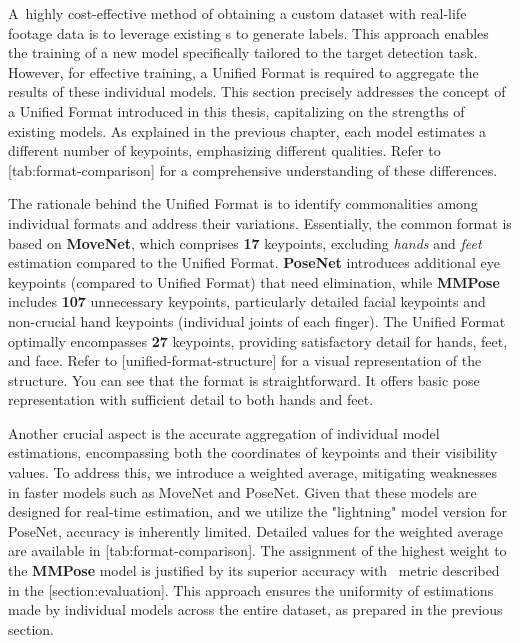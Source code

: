 A~highly cost-effective method of obtaining a custom dataset with real-life footage data is to leverage existing \NN\-s to generate labels. This approach enables the training of a new model specifically tailored to the target detection task. However, for effective training, a Unified Format is required to aggregate the results of these individual models. This section precisely addresses the concept of a Unified Format introduced in this thesis, capitalizing on the strengths of existing models. As explained in the previous chapter, each model estimates a different number of keypoints, emphasizing different qualities. Refer to [tab:format-comparison] for a comprehensive understanding of these differences.

The rationale behind the Unified Format is to identify commonalities among individual formats and address their variations. Essentially, the common format is based on {\bf MoveNet}, which comprises {\bf 17} keypoints, excluding {\em hands} and {\em feet} estimation compared to the Unified Format. {\bf PoseNet} introduces additional eye keypoints (compared to Unified Format) that need elimination, while {\bf MMPose} includes {\bf 107} unnecessary keypoints, particularly detailed facial keypoints and non-crucial hand keypoints (individual joints of each finger). The Unified Format optimally encompasses {\bf 27} keypoints, providing satisfactory detail for hands, feet, and face. Refer to [unified-format-structure] for a visual representation of the structure. You can see that the format is straightforward. It offers basic pose representation with sufficient detail to both hands and feet.

Another crucial aspect is the accurate aggregation of individual model estimations, encompassing both the coordinates of keypoints and their visibility values. To address this, we introduce a weighted average, mitigating weaknesses in faster models such as MoveNet and PoseNet. Given that these models are designed for real-time estimation, and we utilize the "lightning" model version for PoseNet, accuracy is inherently limited. Detailed values for the weighted average are available in [tab:format-comparison]. The assignment of the highest weight to the {\bf MMPose} model is justified by its superior accuracy with \APE\ metric described in the [section:evaluation]. This approach ensures the uniformity of estimations made by individual models across the entire dataset, as prepared in the previous section.

